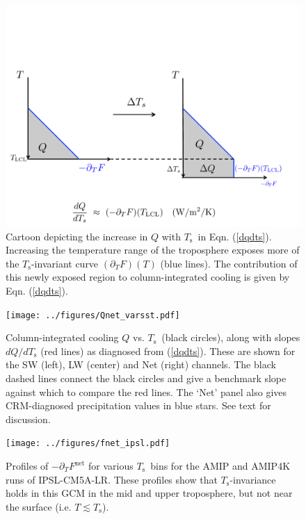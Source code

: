 \documentclass[10pt]{article}
\newcommand{\eqnref}[1]{(\ref{#1})}
\newcommand{\ppt}{\ensuremath{\partial_T}}
\newcommand{\Fnet}{\ensuremath{F^\mathrm{net}}}
\newcommand{\Ts}{\ensuremath{T_\mathrm{s}}}
\begin{document}
\begin{figure}[h]
	\begin{center}
			\includegraphics[scale=0.5,trim=0cm 0cm 0cm 5cm,clip=true]{../figures/dqdts_cartoon.pdf}
		\caption{Cartoon depicting the increase in $Q$ with \Ts\ in Eqn. \eqnref{dqdts}. Increasing the temperature range of the troposphere  exposes more of the \Ts-invariant curve $(\ppt F)(T)$ (blue lines). The contribution  of this newly exposed region to column-integrated cooling is given by Eqn. \eqnref{dqdts}.
		\label{dqdts_cartoon}
		}
	\end{center}
\end{figure}


\begin{figure}[h]
	\begin{center}
			\texttt{[image: ../figures/Qnet\_varsst.pdf]}
		\caption{Column-integrated cooling $Q$ vs. \Ts\ (black circles), along with slopes $d Q/d \Ts$ (red lines) as diagnosed from \eqnref{dqdts}. These are shown for the SW (left), LW (center) and Net (right) channels.  The black dashed lines connect the black circles and give a benchmark slope against which to compare the red lines. The `Net' panel also gives CRM-diagnosed precipitation values in blue stars. See text for discussion.
		\label{Qnet_varsst}
		}
	\end{center}
\end{figure}

\begin{figure}[h]
	\begin{center}
			\texttt{[image: ../figures/fnet\_ipsl.pdf]}
		\caption{ Profiles of $-\ppt \Fnet$ for various \Ts\ bins for the AMIP and AMIP4K runs of IPSL-CM5A-LR.  These profiles show that \Ts-invariance holds in this GCM in the mid and upper troposphere, but not near the surface (i.e. $T \lesssim \Ts$).
		\label{fnet_ipsl}
		}
	\end{center}
\end{figure}
\end{document}
